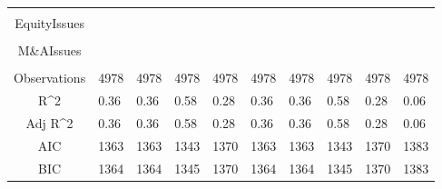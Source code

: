 \documentclass{article}
\begin{document}
\begin{table}[H]
\begin{tabular}{|clllllllll|}
   &  &  &  &  &  &  &  &  &  \\ 
  EquityIssues &  &  &  &  &  &  &  &  &  \\ 
   &  &  &  &  &  &  &  &  &  \\ 
  M\&AIssues &  &  &  &  &  &  &  &  &  \\ 
   &  &  &  &  &  &  &  &  &  \\ 
  \hline 
 Observations & 4978 & 4978 & 4978 & 4978 & 4978 & 4978 & 4978 & 4978 & 4978 \\ 
  R^2 & 0.36 & 0.36 & 0.58 & 0.28 & 0.36 & 0.36 & 0.58 & 0.28 & 0.06 \\ 
  Adj R^2 & 0.36 & 0.36 & 0.58 & 0.28 & 0.36 & 0.36 & 0.58 & 0.28 & 0.06 \\ 
  AIC & 1363 & 1363 & 1343 & 1370 & 1363 & 1363 & 1343 & 1370 & 1383 \\ 
  BIC & 1364 & 1364 & 1345 & 1370 & 1364 & 1364 & 1345 & 1370 & 1383 \\ 
   \hline
\end{tabular}
 
\end{table}
\end{document}
